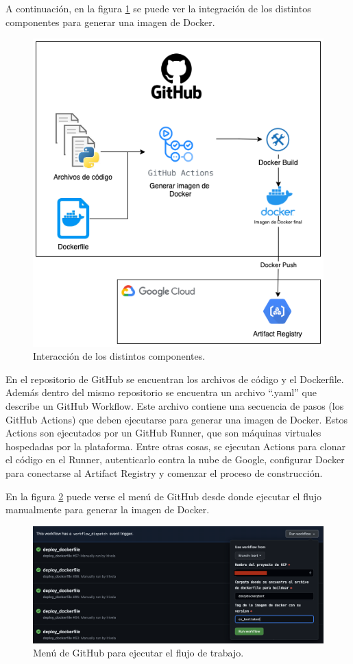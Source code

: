 A continuación, en la figura \ref{fig:cap3-docker-integracion} se puede ver la integración de los distintos componentes para generar una imagen de Docker.

\begin{figure}[htbp]
	\centering
	\includegraphics[width=.6\textwidth]{./Figures/cap3-docker-integracion.png}
	\caption{Interacción de los distintos componentes.}
	\label{fig:cap3-docker-integracion}
\end{figure}

En el repositorio de GitHub se encuentran los archivos de código y el Dockerfile. Además dentro del mismo repositorio se encuentra un archivo ``.yaml'' que describe un GitHub Workflow. Este archivo contiene una secuencia de pasos (los GitHub Actions) que deben ejecutarse para generar una imagen de Docker. Estos Actions son ejecutados por un GitHub Runner, que son máquinas virtuales hospedadas por la plataforma. Entre otras cosas, se ejecutan Actions para clonar el código en el Runner, autenticarlo contra la nube de Google, configurar Docker para conectarse al Artifact Registry y comenzar el proceso de construcción.

En la figura \ref{fig:cap3-gh-docker} puede verse el menú de GitHub desde donde ejecutar el flujo manualmente para generar la imagen de Docker.

\begin{figure}[htbp]
	\centering
	\includegraphics[width=.8\textwidth]{./Figures/cap3-gh-docker.png}
	\caption{Menú de GitHub para ejecutar el flujo de trabajo.}
	\label{fig:cap3-gh-docker}
\end{figure}


